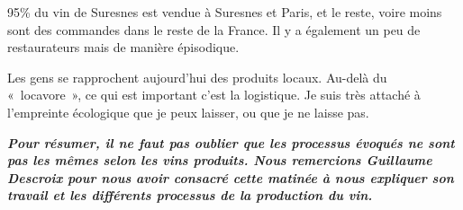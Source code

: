\documentclass[a4paper, titlepage]{report}
\begin{document}
95\% du vin de Suresnes est vendue à Suresnes et Paris, et le reste,
voire moins sont des commandes dans le reste de la France. Il y a
également un peu de restaurateurs mais de manière épisodique.

Les gens se rapprochent aujourd'hui des produits locaux. Au-delà du
«~locavore~», ce qui est important c'est la logistique. Je suis très
attaché à l'empreinte écologique que je peux laisser, ou que je ne
laisse pas.

\textit{\textbf{Pour résumer, il ne faut pas oublier que les processus évoqués ne sont pas les mêmes selon les vins produits. Nous remercions Guillaume Descroix pour nous avoir consacré cette matinée à nous expliquer son travail et les différents processus de la production du vin.}}
\end{document}
